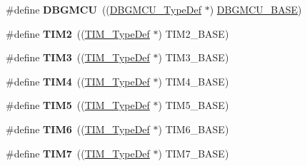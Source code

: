 \begin{DoxyCompactItemize}
\item 
\hypertarget{group___peripheral__declaration_ga92ec6d9ec2251fda7d4ce09748cd74b4}{\#define {\bfseries D\-B\-G\-M\-C\-U}~((\hyperlink{struct_d_b_g_m_c_u___type_def}{D\-B\-G\-M\-C\-U\-\_\-\-Type\-Def} $\ast$) \hyperlink{group___peripheral__memory__map_ga4adaf4fd82ccc3a538f1f27a70cdbbef}{D\-B\-G\-M\-C\-U\-\_\-\-B\-A\-S\-E})}\label{group___peripheral__declaration_ga92ec6d9ec2251fda7d4ce09748cd74b4}

\item 
\hypertarget{group___peripheral__declaration_ga3cfac9f2e43673f790f8668d48b4b92b}{\#define {\bfseries T\-I\-M2}~((\hyperlink{struct_t_i_m___type_def}{T\-I\-M\-\_\-\-Type\-Def} $\ast$) T\-I\-M2\-\_\-\-B\-A\-S\-E)}\label{group___peripheral__declaration_ga3cfac9f2e43673f790f8668d48b4b92b}

\item 
\hypertarget{group___peripheral__declaration_ga61ee4c391385607d7af432b63905fcc9}{\#define {\bfseries T\-I\-M3}~((\hyperlink{struct_t_i_m___type_def}{T\-I\-M\-\_\-\-Type\-Def} $\ast$) T\-I\-M3\-\_\-\-B\-A\-S\-E)}\label{group___peripheral__declaration_ga61ee4c391385607d7af432b63905fcc9}

\item 
\hypertarget{group___peripheral__declaration_ga91a09bad8bdc7a1cb3d85cf49c94c8ec}{\#define {\bfseries T\-I\-M4}~((\hyperlink{struct_t_i_m___type_def}{T\-I\-M\-\_\-\-Type\-Def} $\ast$) T\-I\-M4\-\_\-\-B\-A\-S\-E)}\label{group___peripheral__declaration_ga91a09bad8bdc7a1cb3d85cf49c94c8ec}

\item 
\hypertarget{group___peripheral__declaration_ga5125ff6a23a2ed66e2e19bd196128c14}{\#define {\bfseries T\-I\-M5}~((\hyperlink{struct_t_i_m___type_def}{T\-I\-M\-\_\-\-Type\-Def} $\ast$) T\-I\-M5\-\_\-\-B\-A\-S\-E)}\label{group___peripheral__declaration_ga5125ff6a23a2ed66e2e19bd196128c14}

\item 
\hypertarget{group___peripheral__declaration_gac7b4ed55f9201b498b38c962cca97314}{\#define {\bfseries T\-I\-M6}~((\hyperlink{struct_t_i_m___type_def}{T\-I\-M\-\_\-\-Type\-Def} $\ast$) T\-I\-M6\-\_\-\-B\-A\-S\-E)}\label{group___peripheral__declaration_gac7b4ed55f9201b498b38c962cca97314}

\item 
\hypertarget{group___peripheral__declaration_ga49267c49946fd61db6af8b49bcf16394}{\#define {\bfseries T\-I\-M7}~((\hyperlink{struct_t_i_m___type_def}{T\-I\-M\-\_\-\-Type\-Def} $\ast$) T\-I\-M7\-\_\-\-B\-A\-S\-E)}\label{group___peripheral__declaration_ga49267c49946fd61db6af8b49bcf16394}


\end{DoxyCompactItemize}
